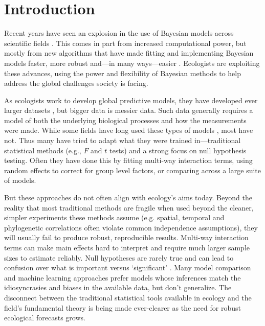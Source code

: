 \documentclass[11pt]{article}
\begin{document}
\setlength{\parindent}{0pt}
\setlength{\parskip}{7pt}

\section*{Introduction}
Recent years have seen an explosion in the use of Bayesian models across scientific fields \citep{vandeschoot2021,schad2021,grinsztajn2021}. This comes in part from increased computational power, but mostly from new algorithms \citep[e.g. Hamiltonian Monte Carlo,][]{nuts2014,betan2019} that have made fitting and implementing Bayesian models faster, more robust and---in many ways---easier \citep{Carpenter:2017stan}. Ecologists are exploiting these advances, using the power and flexibility of Bayesian methods to help address the global challenges society is facing.  

As ecologists work to develop global predictive models, they have developed ever larger datasets \citep{Hampton2013}, but bigger data is messier data. Such data generally requires a model of both the underlying biological processes and how the measurements were made. While some fields have long used these types of models \citep[generally in fields focused on inferring population sizes of things people want to eat or manage,][]{muthuku2008,zheng2007,trijoulet2018,strinella2020potential}, most have not. Thus many have tried to adapt what they were trained in---traditional statistical methods (e.g., $F$ and $t$ tests) and a strong focus on null hypothesis testing. Often they have done this by fitting multi-way interaction terms, using random effects to correct for group level factors, or comparing across a large suite of models. %

But these approaches do not often align with ecology's aims today. Beyond the reality that most traditional methods are fragile when used beyond the cleaner, simpler experiments these methods assume (e.g. spatial, temporal and phylogenetic correlations often violate common independence assumptions), they will usually fail to produce robust, reproducible results. Multi-way interaction terms can make main effects hard to interpret and require much larger sample sizes to estimate reliably. Null hypotheses are rarely true and can lead to confusion over what is important versus `significant' \citep{gelmanhill,muff2022rewriting}. Many model comparison and machine learning approaches prefer models whose inferences match the idiosyncrasies and biases in the available data, but don’t generalize. The disconnect between the traditional statistical tools available in ecology and the field's fundamental theory is being made ever-clearer as the need for robust ecological forecasts grows. 
\end{document}
